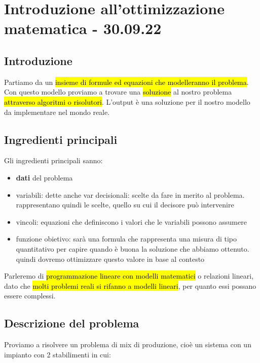 \section{Introduzione all'ottimizzazione matematica - 30.09.22}

\subsection{Introduzione}

Partiamo da un \hl{insieme di formule ed equazioni che modelleranno il problema}. Con questo modello proviamo a trovare una \hl{soluzione} al nostro problema \hl{attraverso algoritmi o risolutori}. L'output è una soluzione per il nostro modello da implementare nel mondo reale.


\subsection{Ingredienti principali}

Gli ingredienti principali sanno:

\begin{itemize}
	\item \textbf{dati} del problema
	\item variabili: dette anche var decisionali: scelte da fare in merito al problema. rappresentano quindi le scelte, quello su cui il decisore può intervenire
	\item vincoli: equazioni che definiscono i valori che le variabili possono assumere
	\item funzione obietivo: sarà una formula che rappresenta una misura di tipo quantitativo per capire quando è buona la soluzione che abbiamo ottenuto. quindi dovremo ottimizzare questo valore in base al contesto
\end{itemize}


Parleremo di \hl{programmazione lineare con modelli matematici} o relazioni lineari, dato che \hl{molti problemi reali si rifanno a modelli lineari}, per quanto essi possano essere complessi.


\subsection{Descrizione del problema}

Proviamo a risolvere un problema di mix di produzione, cioè un sistema con un impianto con 2 stabilimenti in cui:

